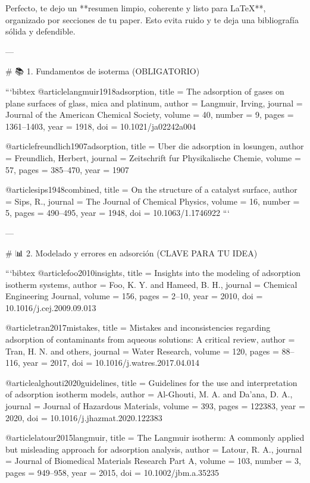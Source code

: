Perfecto, te dejo un **resumen limpio, coherente y listo para LaTeX**, organizado por secciones de tu paper. Esto evita ruido y te deja una bibliografía sólida y defendible.

---

# 📚 1. Fundamentos de isoterma (OBLIGATORIO)

```bibtex
@article{langmuir1918adsorption,
	title = {The adsorption of gases on plane surfaces of glass, mica and platinum},
	author = {Langmuir, Irving},
	journal = {Journal of the American Chemical Society},
	volume = {40},
	number = {9},
	pages = {1361--1403},
	year = {1918},
	doi = {10.1021/ja02242a004}
}

@article{freundlich1907adsorption,
	title = {Uber die adsorption in losungen},
	author = {Freundlich, Herbert},
	journal = {Zeitschrift fur Physikalische Chemie},
	volume = {57},
	pages = {385--470},
	year = {1907}
}

@article{sips1948combined,
	title = {On the structure of a catalyst surface},
	author = {Sips, R.},
	journal = {The Journal of Chemical Physics},
	volume = {16},
	number = {5},
	pages = {490--495},
	year = {1948},
	doi = {10.1063/1.1746922}
}
```

---

# 📊 2. Modelado y errores en adsorción (CLAVE PARA TU IDEA)

```bibtex
@article{foo2010insights,
	title = {Insights into the modeling of adsorption isotherm systems},
	author = {Foo, K. Y. and Hameed, B. H.},
	journal = {Chemical Engineering Journal},
	volume = {156},
	pages = {2--10},
	year = {2010},
	doi = {10.1016/j.cej.2009.09.013}
}

@article{tran2017mistakes,
	title = {Mistakes and inconsistencies regarding adsorption of contaminants from aqueous solutions: A critical review},
	author = {Tran, H. N. and others},
	journal = {Water Research},
	volume = {120},
	pages = {88--116},
	year = {2017},
	doi = {10.1016/j.watres.2017.04.014}
}

@article{alghouti2020guidelines,
	title = {Guidelines for the use and interpretation of adsorption isotherm models},
	author = {Al-Ghouti, M. A. and Da'ana, D. A.},
	journal = {Journal of Hazardous Materials},
	volume = {393},
	pages = {122383},
	year = {2020},
	doi = {10.1016/j.jhazmat.2020.122383}
}

@article{latour2015langmuir,
	title = {The Langmuir isotherm: A commonly applied but misleading approach for adsorption analysis},
	author = {Latour, R. A.},
	journal = {Journal of Biomedical Materials Research Part A},
	volume = {103},
	number = {3},
	pages = {949--958},
	year = {2015},
	doi = {10.1002/jbm.a.35235}
}

